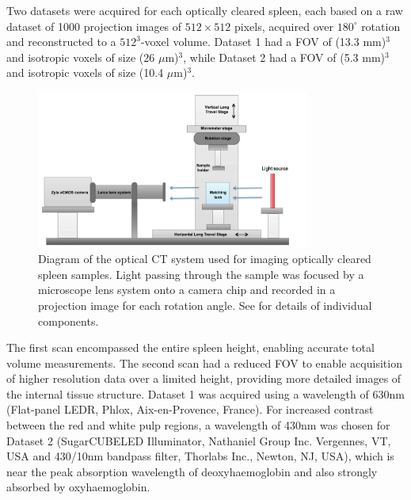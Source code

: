 \documentclass[12pt]{article}
\begin{document}
Two datasets were acquired for each optically cleared spleen, each based on a raw dataset of 1000 projection images of $512\times 512$ pixels, acquired over $180^{\circ}$ rotation and reconstructed to a $512^3$-voxel volume. Dataset 1 had a FOV of (13.3 mm)$^3$ and isotropic voxels of size (26 $\mu$m)$^3$, while Dataset 2 had a FOV of (5.3 mm)$^3$ and isotropic voxels of size (10.4 $\mu$m)$^3$. 

\begin{figure}%
	\centering
	\includegraphics[width=0.8\textwidth]{Figure1.jpg}
	\caption{Diagram of the optical CT system used for imaging optically cleared spleen samples. Light passing through the sample was focused by a microscope lens system onto a camera chip and recorded in a projection image for each rotation angle. See \cite{doranestablishing2013} for details of individual components.}
	\label{fig:1}
\end{figure}


The first scan encompassed the entire spleen height, enabling accurate total volume measurements. The second scan had a reduced FOV to enable acquisition of higher resolution data over a limited height, providing more detailed images of the internal tissue structure. Dataset 1 was acquired using a wavelength of 630nm (Flat-panel LEDR, Phlox, Aix-en-Provence, France). For increased contrast between the red and white pulp regions, a wavelength of 430nm was chosen for Dataset 2 (SugarCUBE\texttrademark LED Illuminator, Nathaniel Group Inc. Vergennes, VT, USA and 430/10nm bandpass filter, Thorlabs Inc., Newton, NJ, USA), which is near the peak absorption wavelength of deoxyhaemoglobin and also strongly absorbed by oxyhaemoglobin.
\end{document}
